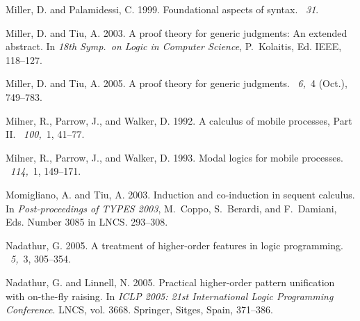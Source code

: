 \documentclass{acmtrans2m}
\begin{document}
\begin{thebibliography}{}
{\sc Miller, D.} {\sc and} {\sc Palamidessi, C.} 1999.
\newblock Foundational aspects of syntax.
~{\em 31}.

{\sc Miller, D.} {\sc and} {\sc Tiu, A.} 2003.
\newblock A proof theory for generic judgments: An extended abstract.
\newblock In {\em 18th Symp.\ on Logic in Computer Science}, {P.~Kolaitis}, Ed.
  IEEE, 118--127.

{\sc Miller, D.} {\sc and} {\sc Tiu, A.} 2005.
\newblock A proof theory for generic judgments.
~{\em 6,\/}~4 (Oct.),
  749--783.

{\sc Milner, R.}, {\sc Parrow, J.}, {\sc and} {\sc Walker, D.} 1992.
\newblock A calculus of mobile processes, {Part II}.
~{\em 100,\/}~1, 41--77.

{\sc Milner, R.}, {\sc Parrow, J.}, {\sc and} {\sc Walker, D.} 1993.
\newblock Modal logics for mobile processes.
~{\em 114,\/}~1, 149--171.

{\sc Momigliano, A.} {\sc and} {\sc Tiu, A.} 2003.
\newblock Induction and co-induction in sequent calculus.
\newblock In {\em Post-proceedings of TYPES 2003}, {M.~Coppo}, {S.~Berardi},
  {and} {F.~Damiani}, Eds. Number 3085 in LNCS. 293--308.

{\sc Nadathur, G.} 2005.
\newblock A treatment of higher-order features in logic programming.
~{\em 5,\/}~3,
  305--354.

{\sc Nadathur, G.} {\sc and} {\sc Linnell, N.} 2005.
\newblock Practical higher-order pattern unification with on-the-fly raising.
\newblock In {\em {ICLP 2005: 21st International Logic Programming
  Conference}}. LNCS, vol. 3668. Springer, Sitges, Spain, 371--386.


\end{thebibliography}
\end{document}
